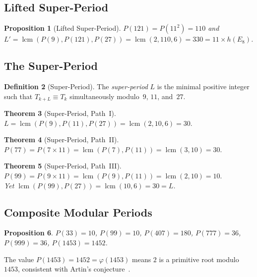 \documentclass[11pt, a4paper]{article}
\theoremstyle{plain}
\newtheorem{theorem}{Theorem}[section]
\newtheorem{proposition}[theorem]{Proposition}
\theoremstyle{definition}
\newtheorem{definition}[theorem]{Definition}
\theoremstyle{remark}
\DeclareMathOperator{\lcm}{lcm}
\begin{document}
\subsection{Lifted Super-Period}

\begin{proposition}[Lifted Super-Period]\label{prop:lifted}
$P(121) = P(11^2) = 110$ and
$L' = \lcm(P(9), P(121), P(27)) = \lcm(2, 110, 6) = 330 = 11 \times
h(E_8)$.
\end{proposition}

\subsection{The Super-Period}\label{sec:super}

\begin{definition}[Super-Period]\label{def:superperiod}
The \emph{super-period} $L$ is the minimal positive integer such that
$T_{k+L} \equiv T_k$ simultaneously modulo~$9$, $11$, and~$27$.
\end{definition}

\begin{theorem}[Super-Period, Path~I]\label{thm:sp1}
$L = \lcm(P(9), P(11), P(27)) = \lcm(2, 10, 6) = 30.$
\end{theorem}

\begin{theorem}[Super-Period, Path~II]\label{thm:sp2}
$P(77) = P(7 \times 11) = \lcm(P(7), P(11)) = \lcm(3, 10) = 30.$
\end{theorem}

\begin{theorem}[Super-Period, Path~III]\label{thm:sp3}
$P(99) = P(9 \times 11) = \lcm(P(9), P(11)) = \lcm(2, 10) = 10.$ \\
Yet $\lcm(P(99), P(27)) = \lcm(10, 6) = 30 = L$.
\end{theorem}

\subsection{Composite Modular Periods}

\begin{proposition}\label{prop:composite}
$P(33) = 10$, \; $P(99) = 10$, \; $P(407) = 180$, \;
$P(777) = 36$, \; $P(999) = 36$, \; $P(1453) = 1452$.
\end{proposition}

The value $P(1453) = 1452 = \varphi(1453)$ means $2$ is a
primitive root modulo~$1453$, consistent with Artin's
conjecture~\cite{artin}.
\end{document}
